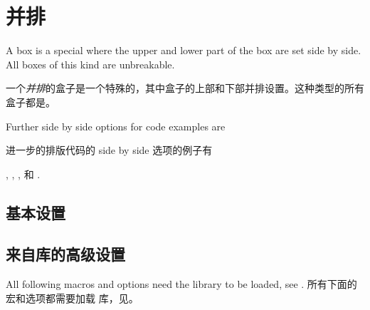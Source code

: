 
\setcounter{section}{5}
\setcounter{subsection}{2}

\section{并排}\label{sec:sidebyside}%
%

A  box is a special  where
the upper and lower part of the box are set side by side.
All boxes of this kind are unbreakable.


一个\emph{并排}的盒子是一个特殊的，其中盒子的上部和下部并排设置。这种类型的所有盒子都是。


\begin{marker}
Further side by side options for code examples are

进一步的排版代码的 side by side 选项的例子有

,
,
, 和
.
\end{marker}

\subsection{基本设置}\label{subsec:sidebyside_basic}



 





\subsection{来自库的高级设置}\label{subsec:sidebyside_xparse}

\begin{marker}
\begin{stripedbox}
All following macros and options need the  library to be
loaded, see .
\tcblower
所有下面的宏和选项都需要加载 库，见。
\end{stripedbox}
\end{marker}


